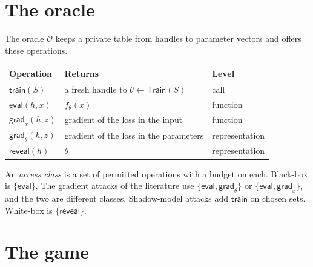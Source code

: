 \documentclass[
]{article}
\newcounter{none} %
\begin{document}
\section{The oracle}\label{the-oracle}

The oracle \(\mathcal{O}\) keeps a private table from handles to
parameter vectors and offers these operations.

{\def\LTcaptype{none} %
\begin{longtable}[]{@{}
  >{\raggedright\arraybackslash}p{}
  >{\raggedright\arraybackslash}p{}
  >{\raggedright\arraybackslash}p{}@{}}
\toprule\noalign{}
\begin{minipage}[b]{\linewidth}\raggedright
Operation
\end{minipage} & \begin{minipage}[b]{\linewidth}\raggedright
Returns
\end{minipage} & \begin{minipage}[b]{\linewidth}\raggedright
Level
\end{minipage} \\
\midrule\noalign{}
\endhead
\bottomrule\noalign{}
\endlastfoot
\(\mathsf{train}(S)\) & a fresh handle to
\(\theta \leftarrow \mathsf{Train}(S)\) & call \\
\(\mathsf{eval}(h, x)\) & \(f_\theta(x)\) & function \\
\(\mathsf{grad}_x(h, z)\) & gradient of the loss in the input &
function \\
\(\mathsf{grad}_\theta(h, z)\) & gradient of the loss in the parameters
& representation \\
\(\mathsf{reveal}(h)\) & \(\theta\) & representation \\
\end{longtable}
}

An \emph{access class} is a set of permitted operations with a budget on
each. Black-box is \(\{\mathsf{eval}\}\). The gradient attacks of the
literature use \(\{\mathsf{eval}, \mathsf{grad}_\theta\}\) or
\(\{\mathsf{eval}, \mathsf{grad}_x\}\), and the two are different
classes. Shadow-model attacks add \(\mathsf{train}\) on chosen sets.
White-box is \(\{\mathsf{reveal}\}\).

\section{The game}\label{the-game}
\end{document}
